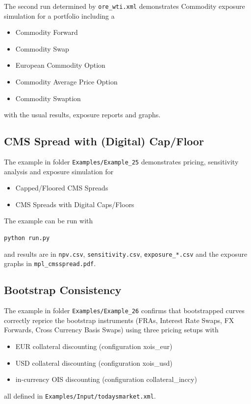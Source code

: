 The second run determined by {\tt ore\_wti.xml} demonstrates Commodity exposure simulation for a portfolio including a
\begin{itemize}
\item Commodity Forward
\item Commodity Swap
\item European Commodity Option
\item Commodity Average Price Option
\item Commodity Swaption
\end{itemize}
with the usual results, exposure reports and graphs.

\subsection{CMS Spread with (Digital) Cap/Floor}%
\label{example:25}

The example in folder {\tt Examples/Example\_25}  demonstrates pricing, sensitivity analysis
and exposure simulation for
\begin{itemize}
\item Capped/Floored CMS Spreads
\item CMS Spreads with Digital Caps/Floors
\end{itemize}

The example can be run with

\medskip
\centerline{\tt python run.py}

\medskip
and results are in {\tt npv.csv}, {\tt sensitivity.csv}, {\tt exposure\_*.csv}
and the exposure graphs in {\tt mpl\_cmsspread.pdf}.

\subsection{Bootstrap Consistency}%

The example in folder {\tt Examples/Example\_26} confirms that bootstrapped curves
correctly reprice the bootstrap instruments (FRAs, Interest Rate Swaps, FX Forwards, Cross
Currency Basis Swaps) using three pricing setups with
\begin{itemize}
\item EUR collateral discounting (configuration xois\_eur)
\item USD collateral discounting (configuration xois\_usd)
\item in-currency OIS discounting (configuration collateral\_inccy)
\end{itemize}
all defined in {\tt Examples/Input/todaysmarket.xml}.

